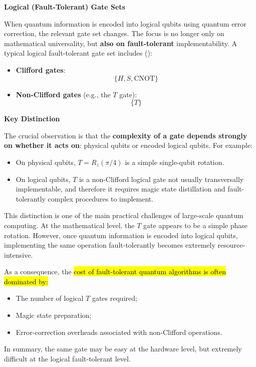 \highspace
\begin{flushleft}
	\textcolor{Green3}{ \textbf{Logical (Fault-Tolerant) Gate Sets}}
\end{flushleft}
When quantum information is encoded into logical qubits using quantum error correction, the relevant gate set changes. The focus is no longer only on mathematical universality, but \textbf{also on fault-tolerant} implementability. A typical logical fault-tolerant gate set includes ():
\begin{itemize}
	\item \textbf{Clifford gates}:
	\begin{equation*}
		\{H, S, \text{CNOT}\}
	\end{equation*}
	\item \textbf{Non-Clifford gates} (e.g., the $T$ gate):
	\begin{equation*}
		\{T\}
	\end{equation*}
\end{itemize}

\begin{flushleft}
	\textcolor{DarkOrange3}{ \textbf{Key Distinction}}
\end{flushleft}
The crucial observation is that the \textbf{complexity of a gate depends strongly on whether it acts on}: physical qubits or encoded logical qubits. For example:
\begin{itemize}
	\item On physical qubits, $T = R_z(\pi/4)$ is a simple single-qubit rotation.
	\item On logical qubits, $T$ is a non-Clifford logical gate not usually transversally implementable, and therefore it requires magic state distillation and fault-tolerantly complex procedures to implement.
\end{itemize}
This distinction is one of the main practical challenges of large-scale quantum computing. At the mathematical level, the $T$ gate appears to be a simple phase rotation. However, once quantum information is encoded into logical qubits, implementing the same operation fault-tolerantly becomes extremely resource-intensive.

\highspace
As a consequence, the \hl{cost of fault-tolerant quantum algorithms is often dominated by:}
\begin{itemize}
	\item The number of logical $T$ gates required;
	\item Magic state preparation;
	\item Error-correction overheads associated with non-Clifford operations.
\end{itemize}
In summary, the same gate may be easy at the hardware level, but extremely difficult at the logical fault-tolerant level.